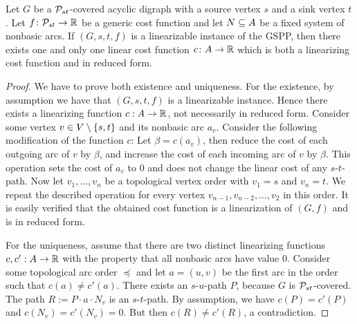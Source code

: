 \begin{lemma}
\label{lemma:nonbasic-arcs}
Let $G$ be a $\mathcal{P}_{st}$-covered acyclic digraph with a source vertex $s$ and a sink vertex $t$. Let  $f\colon  \mathcal{P}_{st} \rightarrow \mathbb{R}$ be a generic cost function and  let $N \subseteq A$ be a fixed system of nonbasic arcs. If  $(G,s,t,f)$ is a linearizable instance of the GSPP, then there exists one and only one linear cost function $c\colon A \rightarrow \mathbb{R}$ which is both a linearizing cost function  and in reduced form.
\end{lemma}
\begin{proof}
    We have to prove both existence and uniqueness. For the existence, by assumption we have that $(G,s,t,f)$ is a linearizable instance. Hence there exists a linearizing function $c : A \rightarrow \mathbb{R}$, not necessarily in reduced form. Consider some vertex $v \in V \setminus \{ s,t \}$ and its nonbasic arc $a_v$. Consider the following modification of the function $c$: Let $\beta = c(a_v)$, then reduce the cost of each outgoing arc of $v$ by $\beta$, and increase the cost of each incoming arc of $v$ by $\beta$. This operation sets the cost of $a_v$ to $0$ and does not change the linear cost of any $s$-$t$-path. Now let $v_1,\dots,v_n$ be a topological vertex order with $v_1 = s$ and $v_n = t$. We repeat the described operation for every vertex $v_{n-1}, v_{n-2}, \dots, v_2$  in this order. It is easily verified that the obtained cost function is a linearization of $(G, f)$ and is in reduced form.
    
    For the uniqueness, assume that there are two distinct linearizing functions $c, c' : A \rightarrow \mathbb{R}$ with the property that all nonbasic arcs have value 0. Consider some topological arc order $\preceq$ and let $a = (u,v)$ be the first arc in the order such that $c(a) \neq c'(a)$. There exists an $s$-$u$-path $P$, because $G$ is $\mathcal{P}_{st}$-covered. The path $R := P \cdot a \cdot N_v$ is an $s$-$t$-path. By assumption, we have $c(P) = c'(P)$ and $c(N_v) = c'(N_v) = 0$. But then $c(R) \neq c'(R)$, a contradiction. 
\end{proof}


